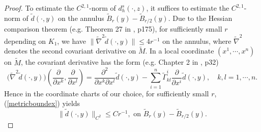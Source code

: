 \documentclass[11pt,letterpaper]{amsart}
\numberwithin{equation}{section}
\theoremstyle{definition}
\theoremstyle{plain}
\theoremstyle{definition}
\theoremstyle{plain}
\theoremstyle{definition}
\theoremstyle{plain}
\begin{document}
\begin{proof}
To estimate the $C^{2,1}$-norm of $d_h^s(\cdot,z)$, it suffices to estimate the $C^{2,1}$-norm of $\widetilde{d}(\cdot,y)$ on the annulus $\widetilde{B}_{r}(y)-\widetilde{B}_{r/2}(y)$. Due to the Hessian comparison theorem (e.g. Theorem 27 in \cite{PP}, p175), for sufficiently small $r$ depending on $K_1$, we have $\|\widetilde{\nabla}^2 \widetilde{d}(\cdot,y) \|\leqslant 4r^{-1}$ on the annulus, where $\widetilde{\nabla}^2$ denotes the second covariant derivative on $\widetilde{M}$. In a local coordinate $(x^1,\cdots,x^n)$ on $\widetilde{M}$, the covariant derivative has the form (e.g. Chapter 2 in \cite{PP}, p32)
\begin{equation}\label{Hessian-local}
\big(\widetilde{\nabla}^2 \widetilde{d}(\cdot,y)\big)(\frac{\partial}{\partial x^k},\frac{\partial}{\partial x^l})=\frac{\partial^2}{\partial x^k \partial x^l} \widetilde{d}(\cdot,y)-\sum_{i=1}^n \widetilde{\Gamma}_{kl}^i \frac{\partial}{\partial x^i} \widetilde{d}(\cdot,y), \quad k,l=1,\cdots,n.
\end{equation}
Hence in the coordinate charts of our choice, for sufficiently small $r$, (\ref{metricboundex}) yields
\begin{equation}\label{dC2}
\|\widetilde{d}(\cdot,y)\|_{C^2} \leqslant C r^{-1},\textrm{ on } \widetilde{B}_{r}(y)-\widetilde{B}_{r/2}(y).
\end{equation}


\end{proof}
\end{document}
